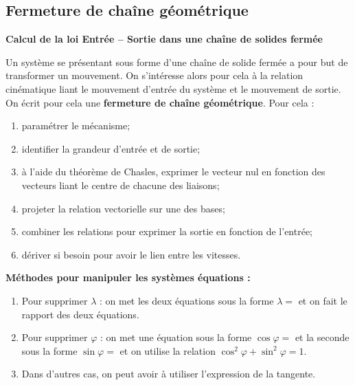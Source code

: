 \documentclass[10pt,oneside]{article}
\begin{document}
\subsection{Fermeture de chaîne géométrique}


\begin{methode}
\textbf{Calcul de la loi Entrée -- Sortie dans une chaîne de solides fermée}

Un système se présentant sous forme d'une chaîne de solide fermée a pour but de transformer un mouvement. On s'intéresse alors pour cela à la relation cinématique liant le mouvement d'entrée du système et le mouvement de sortie. On écrit pour cela une \textbf{fermeture de chaîne géométrique}. Pour cela :
\begin{enumerate}
\item paramétrer le mécanisme;
\item identifier la grandeur d'entrée et de sortie;
\item à l'aide du théorème de Chasles, exprimer le vecteur nul en fonction des vecteurs liant le centre de chacune des liaisons;
\item projeter la relation vectorielle sur une des bases;
\item combiner les relations pour exprimer la sortie en fonction de l'entrée;
\item dériver si besoin pour avoir le lien entre les vitesses. 
\end{enumerate}
\end{methode}


\begin{methode}
\textbf{Méthodes pour manipuler les systèmes équations :} 
\begin{enumerate}
\item Pour supprimer $\lambda$ : on met les deux équations sous la forme $\lambda =$ et on fait le rapport des deux équations.
\item Pour supprimer $\varphi$ : on met une équation sous la forme $\cos\varphi = $ et la seconde sous la forme $\sin\varphi = $ et on utilise la relation $\cos^2\varphi +\sin^2\varphi =1 $.
\item Dans d'autres cas, on peut avoir à utiliser l'expression de la tangente.
\end{enumerate}
\end{methode}
\end{document}

